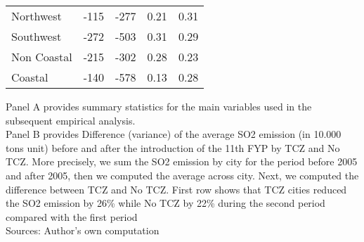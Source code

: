 \documentclass[12pt]{article}
\begin{document}
\begin{table}[!htbp]
\begin{adjustbox}{width=\textwidth, totalheight=\baselineskip,keepaspectratio}
\begin{tabular}{lrrrr}
      Northwest   &    -115 & -277 &     0.21 & 0.31 \\
      Southwest   &    -272 & -503 &     0.31 & 0.29 \\
      Non Coastal &    -215 & -302 &     0.28 & 0.23 \\
      Coastal     &    -140 & -578 &     0.13 & 0.28 \\
      \bottomrule
      \hline
    \end{tabular}
    \end{adjustbox}
    \begin{tablenotes}
      \small
      \item Panel A provides summary statistics for the main variables used in the subsequent empirical analysis. 
       \\
      Panel B provides Difference (variance) of the average SO2 emission (in 10.000 tons unit) before and after the introduction of the 11th FYP by TCZ and No TCZ. More precisely, we sum the SO2 emission by city for the period before 2005 and after 2005, then we computed the average across city. Next, we computed the difference between TCZ and No TCZ. First row shows that TCZ cities reduced the SO2 emission by 26\% while No TCZ by 22\% during the second period compared with the first period
      \\
      Sources: Author's own computation
    \end{tablenotes}
\end{table}
\end{document}
